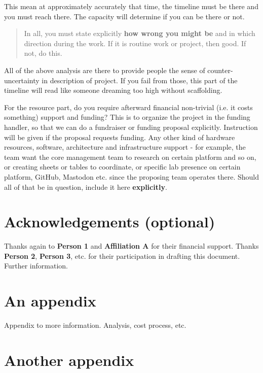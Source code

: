 \documentclass[10pt,a4paper]{article}
\begin{document}
This mean at approximately accurately that time, the timeline must be there and you must reach there. The capacity will determine if you can be there or not. 

\begin{quote}
    In all, you must state explicitly \textbf{how wrong you might be} and in which direction during the work. If it is routine work or project, then good. If not, do this. 
\end{quote}

All of the above analysis are there to provide people the sense of counter-uncertainty in description of project. If you fail from those, this part of the timeline will read like someone dreaming too high without scaffolding. 

For the resource part, do you require afterward financial non-trivial (i.e. it costs something) support and funding? This is to organize the project in the funding handler, so that we can do a fundraiser or funding proposal explicitly. Instruction will be given if the proposal requests funding. Any other kind of hardware resources, software, architecture and infrastructure support - for example, the team want the core management team to research on certain platform and so on, or creating sheets or tables to coordinate, or specific lab presence on certain platform, GitHub, Mastodon etc. since the proposing team operates there. Should all of that be in question, include it here \textbf{explicitly}. 

\section*{Acknowledgements (optional)}

Thanks again to \textbf{Person 1} and \textbf{Affiliation A} for their financial support. Thanks \textbf{Person 2}, \textbf{Person 3}, etc. for their participation in drafting this document. Further information. 


% 
% 

\appendix

\section{An appendix}

Appendix to more information. Analysis, cost process, etc. 

\section{Another appendix}
\end{document}
